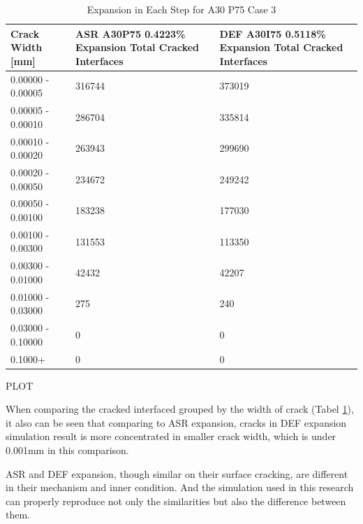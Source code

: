 \begin{table}[!h]
\centering
\begin{tabular}{ |p{4cm}|p{5cm}|p{5cm}| }
\hline
 Crack Width [mm] &  ASR A30P75 0.4223\% Expansion Total Cracked Interfaces  &  DEF A30I75 0.5118\% Expansion Total Cracked Interfaces \\
 \hline\hline

   0.00000 - 0.00005 & 316744 & 373019 \\
   0.00005 - 0.00010 & 286704 & 335814\\
   0.00010 - 0.00020 & 263943 & 299690\\
   0.00020 - 0.00050 & 234672 & 249242\\
   0.00050 - 0.00100 & 183238 & 177030\\
   0.00100 - 0.00300 & 131553 & 113350\\
   0.00300 - 0.01000 & 42432 & 42207\\
   0.01000 - 0.03000 & 275 & 240\\
   0.03000 - 0.10000 & 0 & 0\\
   0.1000+ & 0 & 0\\

  \hline
  \end{tabular}
\caption{Expansion in Each Step for A30 P75 Case 3}
\label{table:A30P75_3_Cracks}
\end{table}


PLOT

When comparing the cracked interfaced grouped by the width of crack (Tabel \ref{table:A30P75_3_Cracks}), it also can be seen that comparing to ASR expansion, cracks in DEF expansion simulation result is more concentrated in smaller crack width,  which is under 0.001mm in this comparison.


ASR and DEF expansion, though similar on their surface cracking, are different in their mechanism and inner condition. And the simulation used in this research can properly reproduce not only the similarities but also the difference between them.
